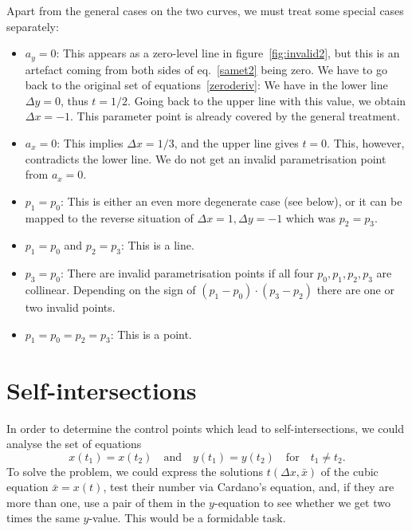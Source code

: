 \documentclass{article}
\begin{document}
Apart from the general cases on the two curves, we must treat some special cases
separately:
%
\begin{itemize}
\item $a_y=0$: This appears as a zero-level line in figure~\ref{fig:invalid2},
    but this is an artefact coming from both sides of eq.~\eqref{samet2} being
    zero. We have to go back to the original set of
    equations~\eqref{zeroderiv}: We have in the lower line $\Delta y=0$, thus
    $t=1/2$. Going back to the upper line with this value, we obtain $\Delta
    x=-1$. This parameter point is already covered by the general treatment.
\item $a_x=0$: This implies $\Delta x=1/3$, and the upper line gives $t=0$.
    This, however, contradicts the lower line. We do not get an invalid
    parametrisation point from $a_x=0$.
\item $p_1=p_0$: This is either an even more degenerate case (see below), or it
    can be mapped to the reverse situation of $\Delta x=1, \Delta y=-1$ which
    was $p_2=p_3$.
\item $p_1=p_0$ and $p_2=p_3$: This is a line.
\item $p_3=p_0$: There are invalid parametrisation points if all four
    $p_0,p_1,p_2,p_3$ are collinear. Depending on the sign of
    $(p_1-p_0)\cdot(p_3-p_2)$ there are one or two invalid points.
\item $p_1=p_0=p_2=p_3$: This is a point.
\end{itemize}
%

\section{Self-intersections}

In order to determine the control points which lead to self-intersections, we
could analyse the set of equations
%
\begin{equation}
    x(t_1) = x(t_2)\quad\text{and}\quad
    y(t_1) = y(t_2) \quad\text{for}\quad t_1\neq t_2.
\end{equation}
%
To solve the problem, we could express the solutions $t(\Delta x, \bar x)$ of
the cubic equation $\bar x = x(t)$, test their number via Cardano's equation,
and, if they are more than one, use a pair of them in the $y$-equation to see
whether we get two times the same $y$-value. This would be a formidable task.
\end{document}
